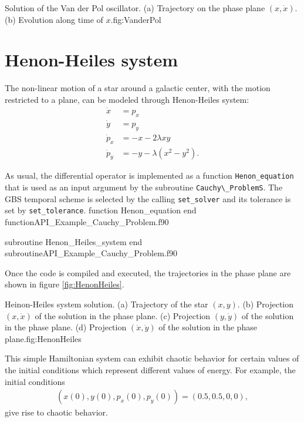   
  
  {Solution of the Van der Pol oscillator. (a) Trajectory on the phase plane $(x,\dot{x})$. (b) Evolution along time of $x$.}{fig:VanderPol}
  

 
  
  \newpage 
  \section{Henon-Heiles system}
  The non-linear motion of a star around a galactic center, with the motion restricted to a plane, can be modeled through Henon-Heiles system:
  \begin{align*}
      \dot{x}    &=p_{x} \\ 
      \dot{y}    &=p_{y} \\  
      \dot{p}_{x}&=-x-2 \lambda x y \\
      \dot{p}_{y}&=-y-\lambda\left(x^{2}-y^{2}\right).
  \end{align*}
  
  As usual, the differential operator is implemented as a function \verb|Henon_equation| that is used as an input argument by the subroutine \verb|Cauchy\_ProblemS|. The GBS temporal scheme is selected by the calling \verb|set_solver| and its tolerance is set by \verb|set_tolerance|. 
  {function Henon_equation}
  {end function}{API_Example_Cauchy_Problem.f90}
  
  {subroutine Henon_Heiles_system}
  {end subroutine}{API_Example_Cauchy_Problem.f90} 
  
  Once the code is compiled and executed, the trajectories in the phase plane are shown in figure \ref{fig:HenonHeiles}. 
  
  \fourgraphs{\HenonHeilesGBSxy{}}{\HenonHeilesGBSxVx{}}
  {\HenonHeilesGBSyVy{}}{\HenonHeilesGBSVxVy{}}
  {Heinon-Heiles system solution. (a) Trajectory of the star $(x,y)$. (b) Projection $(x,\dot{x})$ of the solution in the phase plane. (c) Projection $(y,\dot{y})$ of the solution in the phase plane. (d) Projection $(\dot{x},\dot{y})$ of the solution in the phase plane.}{fig:HenonHeiles}
  
  This simple Hamiltonian system can exhibit chaotic behavior for certain values of the initial conditions which represent different values of energy. For example, the initial conditions
  \begin{align*}
      (x(0),y(0),p_x(0),p_y(0))
      =
      (0.5,0.5,0,0),
  \end{align*}
  give rise to  chaotic behavior.
  
